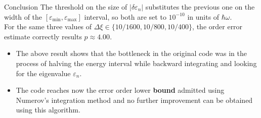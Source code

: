 \documentclass{beamer}
\begin{document}
\begin{frame}{Conclusion}
The threshold on the size of $|\delta \varepsilon_n|$ substitutes the previous one on the width of the $[\varepsilon_{\min},\varepsilon_{\max}]$ interval, so both are set to $10^{-10}$ in units of $\hbar\omega$.\\
\vspace{\baselineskip}
For the same three values of $\Delta \xi\in\{10/1600,10/800,10/400\}$, the order error estimate correctly results $p\approx4.00$.\\
\vspace{0.5em}
\begin{itemize}
\item The above result shows that the bottleneck in the original code was in the process of halving the energy interval while backward integrating and looking for the eigenvalue $\varepsilon_n$.\\
\vspace{0.5em}
\item The code reaches now the error order lower \textbf{bound} admitted using Numerov's integration method and no further improvement can be obtained using this algorithm.
\end{itemize}
\end{frame}
\end{document}
